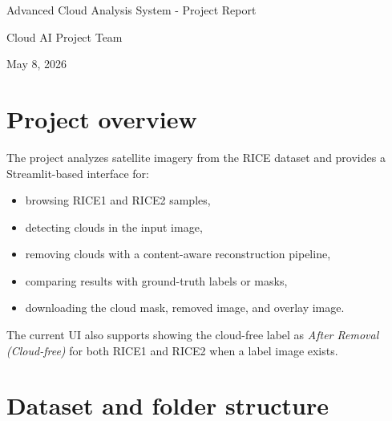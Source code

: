 \documentclass[11pt,a4paper]{article}
\begin{document}
\begin{center}
  {\LARGE Advanced Cloud Analysis System - Project Report\par}
  \vspace{0.4cm}
  {\large Cloud AI Project Team\par}
  \vspace{0.2cm}
  {\large May 8, 2026\par}
\end{center}
\vspace{0.8cm}

\begin{abstract}
This report documents the Advanced Cloud Analysis System end to end: dataset organization, cloud detection and removal methods, implementation details, libraries, model usage, current UI behavior, screenshots, outputs, and reproducibility notes. The figures in this document are actual screenshots captured from the Streamlit app and stored in \verb|report/figures/|.
\end{abstract}

\section{Project overview}
The project analyzes satellite imagery from the RICE dataset and provides a Streamlit-based interface for:
\begin{itemize}
  \item browsing RICE1 and RICE2 samples,
  \item detecting clouds in the input image,
  \item removing clouds with a content-aware reconstruction pipeline,
  \item comparing results with ground-truth labels or masks,
  \item downloading the cloud mask, removed image, and overlay image.
\end{itemize}

The current UI also supports showing the cloud-free label as \emph{After Removal (Cloud-free)} for both RICE1 and RICE2 when a label image exists.

\section{Dataset and folder structure}
\end{document}
